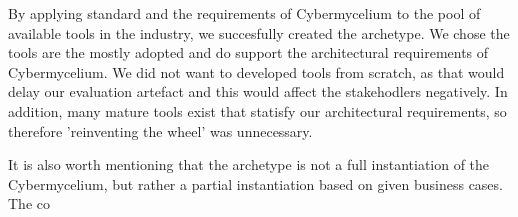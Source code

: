 \documentclass[review]{elsarticle}
\begin{document}
By applying standard and the requirements of Cybermycelium to the pool of available tools in the industry, we succesfully created the archetype. We chose the tools are the mostly adopted and do support the architectural requirements of Cybermycelium. We did not want to developed tools from scratch, as that would delay our evaluation artefact and this would affect the stakehodlers negatively. In addition, many mature tools exist that statisfy our architectural requirements, so therefore 'reinventing the wheel' was unnecessary.

It is also worth mentioning that the archetype is not a full instantiation of the Cybermycelium, but rather a partial instantiation based on given business cases. The co



\end{document}
